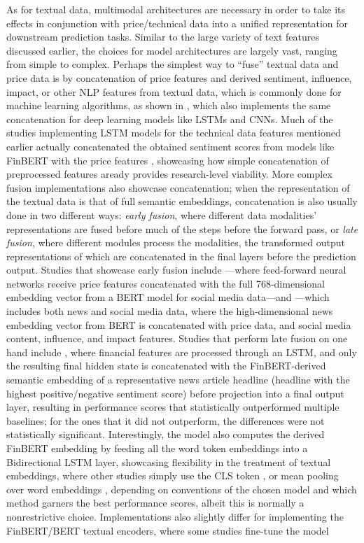 \documentclass[stu,floatsintext]{apa7}
\begin{document}
As for textual data, multimodal architectures are necessary in order to take its effects in conjunction with price/technical data into a unified representation for downstream prediction tasks. Similar to the large variety of text features discussed earlier, the choices for model architectures are largely vast, ranging from simple to complex. Perhaps the simplest way to ``fuse'' textual data and price data is by concatenation of price features and derived sentiment, influence, impact, or other NLP features from textual data, which is commonly done for machine learning algorithms, as shown in \textcite{saravanos2024forecasting}, which also implements the same concatenation for deep learning models like LSTMs and CNNs. Much of the studies implementing LSTM models for the technical data features mentioned earlier actually concatenated the obtained sentiment scores from models like FinBERT with the price features \parencite{halder2022finbertlstm,gu2024predicting,karadas2025multimodal}, showcasing how simple concatenation of preprocessed features aready provides research-level viability. More complex fusion implementations also showcase concatenation; when the representation of the textual data is that of full semantic embeddings, concatenation is also usually done in two different ways: \textit{early fusion}, where different data modalities' representations are fused before much of the steps before the forward pass, or \textit{late fusion}, where different modules process the modalities, the transformed output representations of which are concatenated in the final layers before the prediction output. Studies that showcase early fusion include \textcite{albada2025predicting}—where feed-forward neural networks receive price features concatenated with the full 768-dimensional embedding vector from a BERT model for social media data—and \textcite{sun2026intelligent}—which includes both news and social media data, where the high-dimensional news embedding vector from BERT is concatenated with price data, and social media content, influence, and impact features. Studies that perform late fusion on one hand include \textcite{chen2024deep}, where financial features are processed through an LSTM, and only the resulting final hidden state is concatenated with the FinBERT-derived semantic embedding of a representative news article headline (headline with the highest positive/negative sentiment score) before projection into a final output layer, resulting in performance scores that statistically outperformed multiple baselines; for the ones that it did not outperform, the differences were not statistically significant. Interestingly, the model also computes the derived FinBERT embedding by feeding all the word token embeddings into a Bidirectional LSTM layer, showcasing flexibility in the treatment of textual embeddings, where other studies simply use the CLS token \parencite{liao2026generalized,chen2026newsdriven}, or mean pooling over word embeddings \parencite{bustarviejo2026multimodal}, depending on conventions of the chosen model and which method garners the best performance scores, albeit this is normally a nonrestrictive choice. Implementations also slightly differ for implementing the FinBERT/BERT textual encoders, where some studies \parencite{chen2021stock} fine-tune the model 
\end{document}
